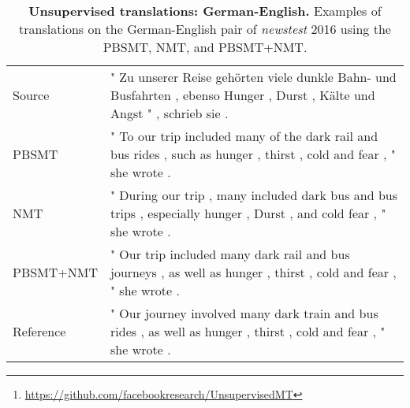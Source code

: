\documentclass[11pt,a4paper]{article}
\begin{document}
{\begin{table*}[p]
{\begin{tabular}{ll}
        \midrule
    
        Source    & " Zu unserer Reise gehörten viele dunkle Bahn- und Busfahrten , ebenso Hunger , Durst , Kälte und Angst " , schrieb sie . \\
        PBSMT     & " To our trip included many of the dark rail and bus rides , such as hunger , thirst , cold and fear , " she wrote . \\
        NMT       & " During our trip , many included dark bus and bus trips , especially hunger , Durst , and cold fear , " she wrote . \\
        PBSMT+NMT & " Our trip included many dark rail and bus journeys , as well as hunger , thirst , cold and fear , " she wrote . \\
        Reference & " Our journey involved many dark train and bus rides , as well as hunger , thirst , cold and fear , " she wrote . \\
    
        \bottomrule
    
        \end{tabular}
        \smallskip
    }
    \caption{\small \textbf{Unsupervised translations: German-English.} Examples of translations on the German-English pair of \textit{newstest} 2016 using the PBSMT, NMT, and PBSMT+NMT. \label{tab:translations_deen}}
    \end{table*}
}
 
\begin{abstract}
Machine translation systems achieve near human-level performance on some languages, yet
their effectiveness strongly relies on the availability of large amounts of parallel sentences, which hinders their applicability to the majority of language pairs. This work investigates how to learn to translate when having access to only large monolingual corpora in each language. We propose two model variants, a neural and a phrase-based model. Both versions leverage a careful initialization of the parameters, the denoising effect of language models and automatic generation of parallel data by iterative back-translation. These models are significantly better than methods from the literature, while being simpler and having fewer hyper-parameters.
On the widely used WMT'14 English-French and WMT'16 German-English benchmarks, our models respectively obtain 28.1 and 25.2 BLEU points without using a single parallel sentence, outperforming the state of the art by more than 11 BLEU points. On low-resource languages like English-Urdu and English-Romanian, our methods achieve even better results than semi-supervised and supervised approaches leveraging the paucity of available bitexts. Our code for NMT and PBSMT is publicly available.\footnote{\url{https://github.com/facebookresearch/UnsupervisedMT}}\end{abstract}
\end{document}
